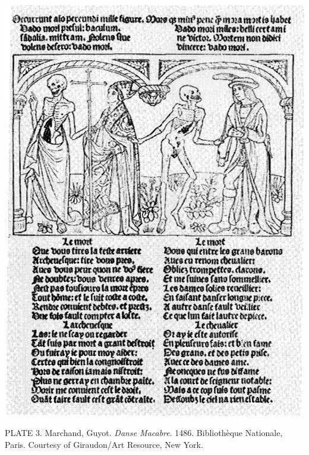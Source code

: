 \protect\hypertarget{20_ILLUSTRATIONS_FOLLOW_PAGE.xhtmlux5cux23id_4}{}{}\includegraphics{include/html/images/324_1.png}

PLATE 3. Marchand, Guyot. \emph{Danse Macabre}. 1486. Bibliothèque
Nationale, Paris. Courtesy of Giraudon/Art Resource, New York.

